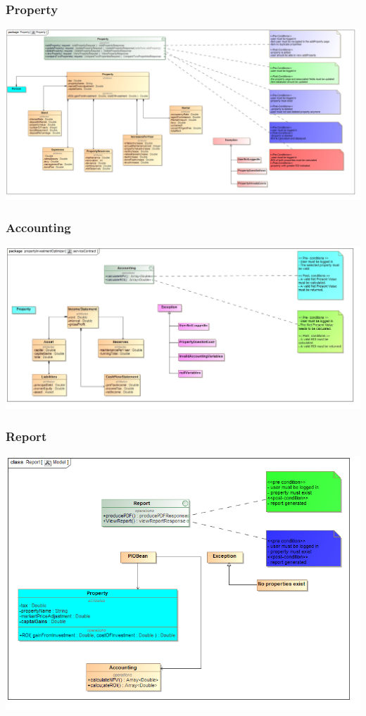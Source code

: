 \documentclass[a4paper,12pt]{article}
\begin{document}
\subsubsection{Property}
\includegraphics[width=1\textwidth]{./Images/newDiagrams/serviceContract/Property.png} 

\subsubsection{Accounting}
\includegraphics[width=1\textwidth]{./Images/newDiagrams/serviceContract/Priscilla/serviceContract.jpg}

\subsubsection{Report}
\includegraphics[width=1\textwidth]{./Images/newDiagrams/serviceContract/ReportServiceContract.png}
\end{document}
